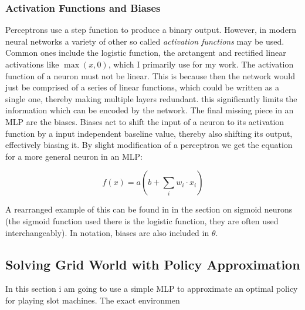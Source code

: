 \subsubsection{Activation Functions and Biases}\label{subsubsec:nn:comp:activation}
Perceptrons use a step function to produce a binary output. However, in modern neural networks a variety of other so called \textit{activation functions} may be used. Common ones include the logistic function, the arctangent and rectified linear activations like $\max(x, 0)$, which I primarily use for my work. The activation function of a neuron must not be linear. This is because then the network would just be comprised of a series of linear functions, which could be written as a single one, thereby making multiple layers redundant. this significantly limits the information which can be encoded by the network. 
The final missing piece in an MLP are the biases. Biases act to shift the input of a neuron to its activation function by a input independent baseline value, thereby also shifting its output, effectively biasing it. By slight modification of a perceptron we get the equation for a more general neuron in an MLP:

\begin{equation}\label{neuron}
    f(x) = a(b + \sum_i w_i \cdot x_i)
\end{equation}

\noindent
A rearranged example of this can be found in \cite[chap. 1]{nielsen_neural_2015} in the section on sigmoid neurons (the sigmoid function used there is the logistic function, they are often used interchangeably). In notation, biases are also included in $\theta$.

\subsection{Solving Grid World with Policy Approximation}\label{subsec:nn:example}
In this section i am going to use a simple MLP to approximate an optimal policy for playing slot machines. The exact environmen